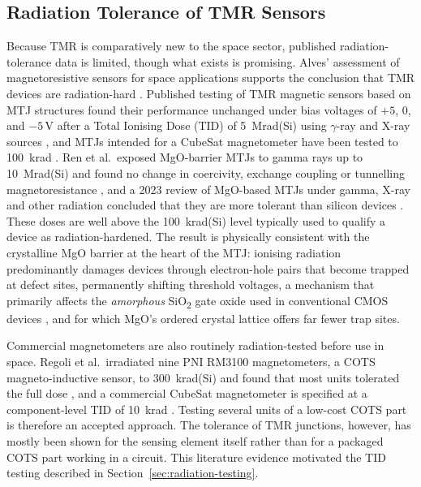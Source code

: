 \documentclass[12pt,a4paper]{article}
\begin{document}
\subsection{Radiation Tolerance of TMR Sensors}
\label{sec:rad-tolerance-lit}

Because TMR is comparatively new to the space sector, published radiation-tolerance data is limited, though what exists is promising. Alves' assessment of magnetoresistive sensors for space applications supports the conclusion that TMR devices are radiation-hard \cite{alves-thesis}. Published testing of TMR magnetic sensors based on MTJ structures found their performance unchanged under bias voltages of $+5$, $0$, and $-5\,\text{V}$ after a Total Ionising Dose (TID) of \SI{5}{\mega rad}(Si) using $\gamma$-ray and X-ray sources \cite{tmr-bias-radiation}, and MTJs intended for a CubeSat magnetometer have been tested to \SI{100}{\kilo rad} \cite{nguyen2010}. Ren et al.\ exposed MgO-barrier MTJs to gamma rays up to \SI{10}{\mega rad}(Si) and found no change in coercivity, exchange coupling or tunnelling magnetoresistance \cite{ren2012}, and a 2023 review of MgO-based MTJs under gamma, X-ray and other radiation concluded that they are more tolerant than silicon devices \cite{seifu2023}. These doses are well above the \SI{100}{\kilo rad}(Si) level typically used to qualify a device as radiation-hardened. The result is physically consistent with the crystalline MgO barrier at the heart of the MTJ: ionising radiation predominantly damages devices through electron-hole pairs that become trapped at defect sites, permanently shifting threshold voltages, a mechanism that primarily affects the \emph{amorphous} SiO\textsubscript{2} gate oxide used in conventional CMOS devices \cite{tid-basics-lanl}, and for which MgO's ordered crystal lattice offers far fewer trap sites.

Commercial magnetometers are also routinely radiation-tested before use in space. Regoli et al.\ irradiated nine PNI RM3100 magnetometers, a COTS magneto-inductive sensor, to \SI{300}{\kilo rad}(Si) and found that most units tolerated the full dose \cite{regoli2020}, and a commercial CubeSat magnetometer is specified at a component-level TID of \SI{10}{\kilo rad} \cite{nss_magnetometer}. Testing several units of a low-cost COTS part is therefore an accepted approach. The tolerance of TMR junctions, however, has mostly been shown for the sensing element itself rather than for a packaged COTS part working in a circuit. This literature evidence motivated the TID testing described in Section~\ref{sec:radiation-testing}.
\end{document}
